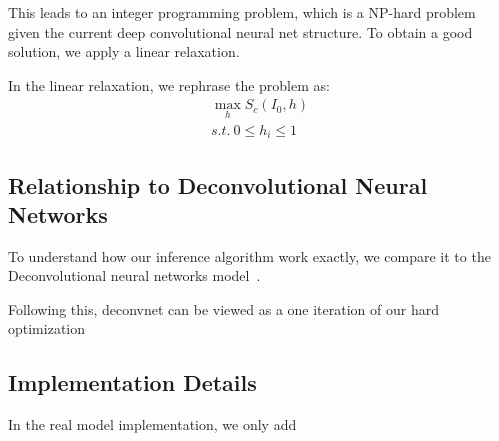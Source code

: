 This leads to an integer programming problem, which is a NP-hard problem given the current deep convolutional neural net structure. To obtain a good solution, we apply a linear relaxation.

In the linear relaxation, we rephrase the problem as:
\begin{equation}
\begin{aligned}
  \max_h S_c(I_0, h) \\
  s.t.\ 0 \leq h_i \leq 1
\end{aligned}
\end{equation}

\subsection{Relationship to Deconvolutional Neural Networks}
To understand how our inference algorithm work exactly, we compare it to the Deconvolutional neural networks model~\cite{}.

Following this, deconvnet can be viewed as a one iteration of our hard optimization

\subsection{Implementation Details}
In the real model implementation, we only add
